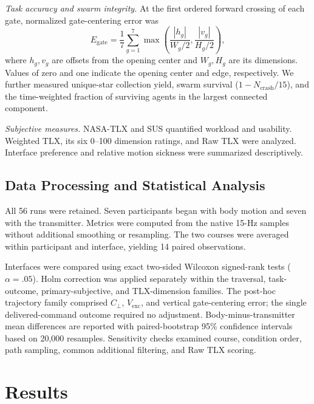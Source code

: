 \emph{Task accuracy and swarm integrity.}
At the first ordered forward crossing of each gate, normalized gate-centering
error was
\begin{equation}
E_{\mathrm{gate}}=\frac{1}{7}\sum_{g=1}^{7}
\max\left(\frac{|h_g|}{W_g/2},\frac{|v_g|}{H_g/2}\right),
\label{eq:gate_error}
\end{equation}
where $h_g,v_g$ are offsets from the opening center and $W_g,H_g$ are its
dimensions. Values of zero and one indicate the opening center and edge,
respectively. We further measured unique-star collection yield, swarm survival
($1-N_{\mathrm{crash}}/15$), and the time-weighted fraction of surviving
agents in the largest connected component.

\emph{Subjective measures.}
NASA-TLX and SUS quantified workload and usability. Weighted TLX, its six
0--100 dimension ratings, and Raw TLX were analyzed. Interface preference and
relative motion sickness were summarized descriptively.

\subsection{Data Processing and Statistical Analysis}
\label{sec:statistical_analysis}

All 56 runs were retained. Seven participants began with body motion and seven
with the transmitter. Metrics were computed from the native 15-Hz samples
without additional smoothing or resampling. The two courses were averaged
within participant and interface, yielding 14 paired observations.

Interfaces were compared using exact two-sided Wilcoxon signed-rank tests
($\alpha=.05$). Holm correction was applied separately within the traversal,
task-outcome, primary-subjective, and TLX-dimension families. The post-hoc
trajectory family comprised $C_{\perp}$, $V_{\mathrm{exc}}$, and vertical
gate-centering error; the single delivered-command outcome required no
adjustment. Body-minus-transmitter mean differences are reported with
paired-bootstrap 95\% confidence intervals based on 20,000 resamples.
Sensitivity checks examined course, condition order, path sampling, common
additional filtering, and Raw TLX scoring.

\section{Results}

